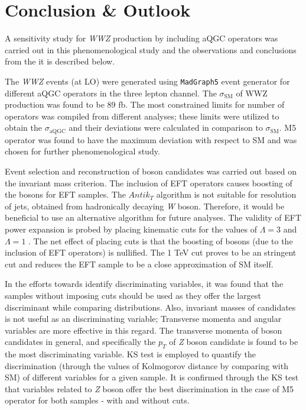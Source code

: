 %
\chapter{Conclusion \& Outlook}

A sensitivity study for \textit{WWZ} production by including aQGC operators was carried out in this phenomenological study and the observations and conclusions from the it is described below. 

The \textit{WWZ} events (at LO) were generated using \texttt{MadGraph5} event generator for different aQGC operators in the three lepton channel. The $\sigma_\text{SM}$ of WWZ production was found to be 89 fb. The most constrained limits for number of operators was compiled from different analyses; these limits were utilized to obtain the $\sigma_\text{aQGC}$ and their deviations were calculated in comparison to $\sigma_\text{SM}$. M5 operator was found to have the maximum deviation with respect to SM and was chosen for further phenomenological study. 

Event selection and reconstruction of boson candidates was carried out based on the invariant mass criterion. The inclusion of EFT operators causes boosting of the bosons for EFT samples. The $Antik_{T}$ algorithm is not suitable for resolution of jets, obtained from hadronically decaying \textit{W} boson. Therefore, it would be beneficial to use an alternative algorithm for future analyses. The validity of EFT power expansion is probed by placing kinematic cuts for the values of $\Lambda= 3$  and $\Lambda= 1$ . The net effect of placing cuts is that the boosting of bosons (due to the inclusion of EFT operators) is nullified. The 1 TeV cut proves to be an stringent cut and reduces the EFT sample to be a close approximation of SM itself. 

In the efforts towards identify discriminating variables, it was found that the samples without imposing cuts should be used as they offer the largest discriminant while comparing distributions. Also, invariant masses of candidates is not useful as an discriminating variable; Transverse momenta and angular variables are more effective in this regard. The transverse momenta of boson candidates in general, and specifically the $p_{T}$ of \textit{Z} boson candidate is found to be the most discriminating variable. KS test is employed to quantify the discrimination (through the values of Kolmogorov distance by comparing with SM) of different variables for a given sample. It is confirmed through the KS test that variables related to \textit{Z} boson offer the best discrimination in the case of M5 operator for both samples - with and without cuts.

